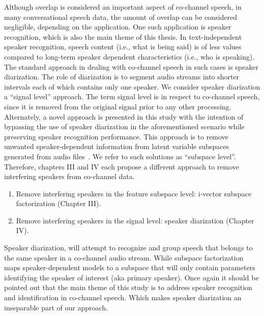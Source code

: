 Although overlap is considered an important aspect of co-channel speech, in many conversational speech data, the amount of overlap can be considered negligible, depending on the application. 
One such application is speaker recognition, which is also the main theme of this thesis. 
In text-independent speaker recognition, speech content (i.e., what is being said) is of less values compared to long-term speaker dependent characteristics (i.e., who is speaking). 
The standard approach in dealing with co-channel speech in such cases is speaker diarization. 
The role of diarization is to segment audio streams into shorter intervals each of which contains only one speaker. 
We consider speaker diarization a ``signal level'' approach. 
The term signal level is in respect to co-channel speech, since it is removed from the original signal prior to any other processing.
Alternately, a novel approach is presented in this study with the intention of bypassing the use of speaker diarization in the aforementioned scenario while preserving speaker recognition performance. 
This approach is to remove unwanted speaker-dependent information from latent variable subspaces generated from audio files~\cite{dehak2011front,kenny2010bayesian}. 
We refer to such solutions as ``subspace level''. 
Therefore, chapters III and IV each propose a different approach to remove interfering speakers from co-channel data. 
\begin{enumerate}
\item Remove interfering speakers in the feature subspace level: i-vector subspace factorization (Chapter III).
\item Remove interfering speakers in the signal level: speaker diarization (Chapter IV).
\end{enumerate}

Speaker diarization, will attempt to recognize and group speech that belongs to the same speaker in a co-channel audio stream. 
While subspace factorization maps speaker-dependent models to a subspace that will only contain parameters identifying the speaker of interest (aka primary speaker). 
Once again it should be pointed out that the main theme of this study is to address speaker recognition and identification in co-channel speech. 
Which makes speaker diarization an inseparable part of our approach. 


